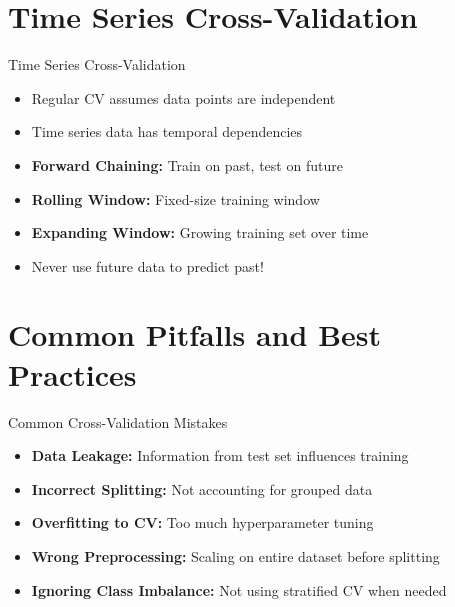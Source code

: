 \documentclass[usenames,dvipsnames]{beamer}
\begin{document}
\section{Time Series Cross-Validation}

\begin{frame}{Time Series Cross-Validation}
\begin{itemize}
	\item \pause Regular CV assumes data points are independent
	\item \pause Time series data has temporal dependencies
	\item \pause \textbf{Forward Chaining:} Train on past, test on future
	\item \pause \textbf{Rolling Window:} Fixed-size training window
	\item \pause \textbf{Expanding Window:} Growing training set over time
	\item \pause Never use future data to predict past!
\end{itemize}
\end{frame}

\section{Common Pitfalls and Best Practices}

\begin{frame}{Common Cross-Validation Mistakes}
\begin{itemize}
	\item \pause \textbf{Data Leakage:} Information from test set influences training
	\item \pause \textbf{Incorrect Splitting:} Not accounting for grouped data
	\item \pause \textbf{Overfitting to CV:} Too much hyperparameter tuning
	\item \pause \textbf{Wrong Preprocessing:} Scaling on entire dataset before splitting
	\item \pause \textbf{Ignoring Class Imbalance:} Not using stratified CV when needed
\end{itemize}
\end{frame}
\end{document}
